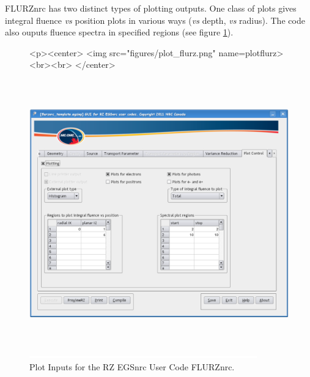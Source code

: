 \documentclass[12pt,twoside]{article}   %
\begin{document}
FLURZnrc has two distinct types of plotting outputs. One class of plots gives integral fluence {\em vs} 
position plots in various ways ({\em vs} depth, {\em vs} radius). The code also ouputs fluence spectra 
in specified regions (see figure \ref{plotflurz}).
\begin{figure}[htb]
\begin{htmlonly}
\begin{rawhtml}
<p><center>
<img src="figures/plot_flurz.png" name=plotflurz><br><br>
</center>
\end{rawhtml}
\end{htmlonly}
\begin{latexonly}
\begin{center}
\includegraphics[height=11.56cm]{figures/plot_flurz}
\end{center}
\end{latexonly}
\begin{center}
\includegraphics[height=1mm]{figures/fake2}
\end{center}
\caption{Plot Inputs for the RZ EGSnrc User Code FLURZnrc.}
\label{plotflurz}
\end{figure}

\clearpage
\vspace*{-1.7cm}

\typeout{}
\typeout{}

\setlength{\parindent}{0em}
\end{document}

